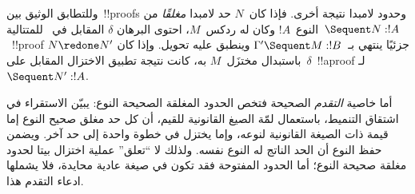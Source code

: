 \documentclass[../../../include/open-logic-section]{subfiles}
\begin{document}
وللتطابق الوثيق بين~!!{proof}s وحدود لامبدا نتيجة أخرى. فإذا كان~$N$ حد
لامبدا \emph{مغلقًا} من النوع~$!A$ وكان له ردكس~$M$، احتوى البرهان
$\delta$ المقابل في~ للمتتالية~$\Sequent N:!A$~!!{proof} جزئيًا
ينتهي بـ~$\Gamma'\Sequent M:!B$ وينطبق عليه تحويل. وإذا كان
$N\redone N'$ باستبدال مختزَل~$M$ به، كانت نتيجة تطبيق الاختزال المقابل
على~$\delta$~!!a{proof} لـ~$\Sequent N':!A$.

أما خاصية \emph{التقدم} الصحيحة فتخص الحدود المغلقة الصحيحة النوع: يبيّن
الاستقراء في اشتقاق التنميط، باستعمال لمّة الصيغ القانونية للقيم، أن كل حد
مغلق صحيح النوع إما قيمة ذات الصيغة القانونية لنوعه، وإما يختزل في خطوة
واحدة إلى حد آخر. ويضمن حفظ النوع أن الحد الناتج له النوع نفسه. ولذلك لا
``تعلق'' عملية اختزال بيتا لحدود مغلقة صحيحة النوع؛ أما الحدود المفتوحة فقد
تكون في صيغة عادية محايدة، فلا يشملها ادعاء التقدم هذا.
\end{document}
